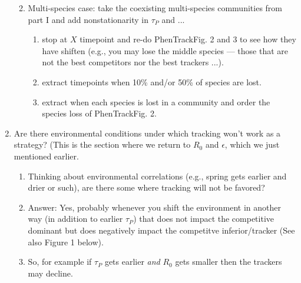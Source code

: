 \documentclass[11pt,letterpaper]{article}
\begin{document}
\begin{enumerate}
\begin{enumerate}
\begin{enumerate}
\end{enumerate}
\item Multi-species case: take the coexisting multi-species communities from part I and add nonstationarity in $\tau_P$ and ...
\begin{enumerate}
\item stop at $X$ timepoint and re-do PhenTrackFig. 2 and 3 to see how they have shiften (e.g., you may lose the middle species --- those that are not the best competitors nor the best trackers ...).
\item extract timepoints when 10\% and/or 50\% of species are lost. 
\item extract when each species is lost in a community and order the species loss of PhenTrackFig. 2.
\end{enumerate}
\end{enumerate}
\item Are there environmental conditions under which tracking won't work as a strategy? (This is the section where we return to $R_{0}$ and $\epsilon$, which we just mentioned earlier.
\begin{enumerate}
\item Thinking about environmental correlations (e.g., spring gets earlier and drier or such), are there some where tracking will not be favored?
\item Answer: Yes, probably whenever you shift the environment in another way (in addition to earlier $\tau_P$) that does not impact the competitive dominant but does negatively impact the competitve inferior/tracker (See also Figure 1 below). 
\item So, for example if $\tau_P$ gets earlier \emph{and} $R_0$ gets smaller then the trackers may decline.  
\end{enumerate}
\end{enumerate}



\newpage
\end{document}
